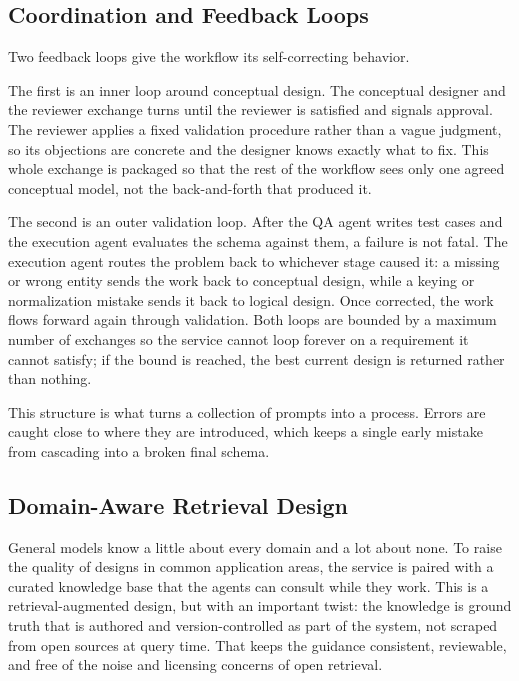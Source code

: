 \subsection{Coordination and Feedback Loops}

Two feedback loops give the workflow its self-correcting behavior.

The first is an inner loop around conceptual design. The conceptual designer and the reviewer exchange turns until the reviewer is satisfied and signals approval. The reviewer applies a fixed validation procedure rather than a vague judgment, so its objections are concrete and the designer knows exactly what to fix. This whole exchange is packaged so that the rest of the workflow sees only one agreed conceptual model, not the back-and-forth that produced it.

The second is an outer validation loop. After the QA agent writes test cases and the execution agent evaluates the schema against them, a failure is not fatal. The execution agent routes the problem back to whichever stage caused it: a missing or wrong entity sends the work back to conceptual design, while a keying or normalization mistake sends it back to logical design. Once corrected, the work flows forward again through validation. Both loops are bounded by a maximum number of exchanges so the service cannot loop forever on a requirement it cannot satisfy; if the bound is reached, the best current design is returned rather than nothing.

This structure is what turns a collection of prompts into a process. Errors are caught close to where they are introduced, which keeps a single early mistake from cascading into a broken final schema.

\subsection{Domain-Aware Retrieval Design}

General models know a little about every domain and a lot about none. To raise the quality of designs in common application areas, the service is paired with a curated knowledge base that the agents can consult while they work. This is a retrieval-augmented design, but with an important twist: the knowledge is ground truth that is authored and version-controlled as part of the system, not scraped from open sources at query time. That keeps the guidance consistent, reviewable, and free of the noise and licensing concerns of open retrieval.

